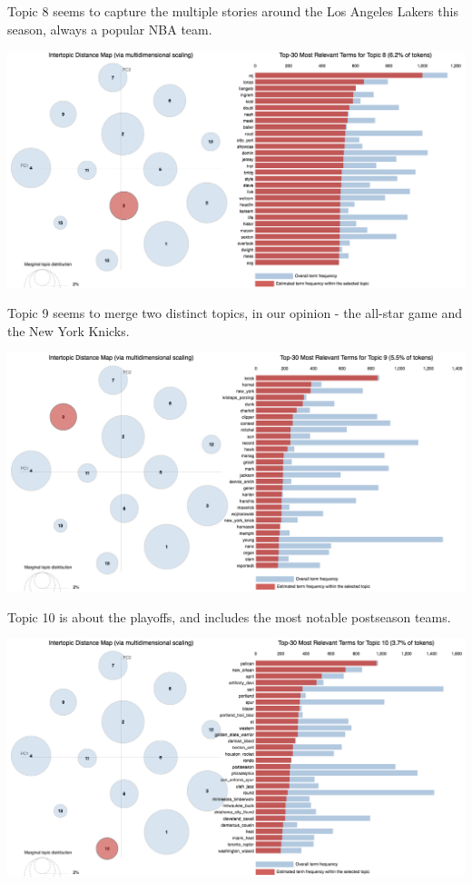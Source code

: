 \documentclass[11pt]{article}
\begin{document}
Topic 8 seems to capture the multiple stories around the Los Angeles Lakers this season, always a popular NBA team. 

\includegraphics[width=470pt]{8.png} 

Topic 9 seems to merge two distinct topics, in our opinion - the all-star game and the New York Knicks. 

\includegraphics[width=470pt]{9.png} 

Topic 10 is about the playoffs, and includes the most notable postseason teams. 

\includegraphics[width=470pt]{10.png} 
\end{document}
